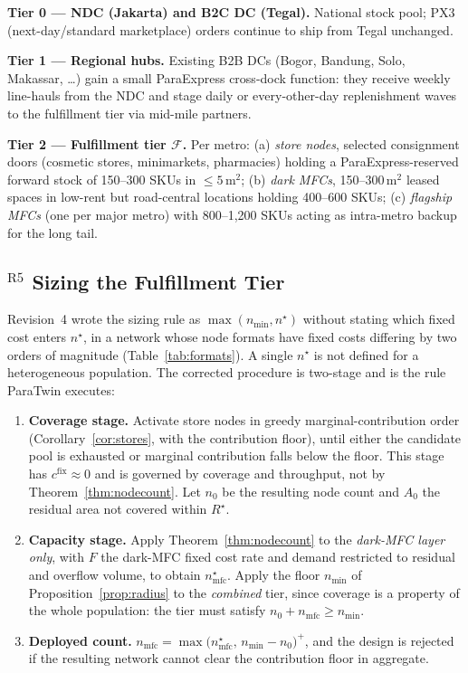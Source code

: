 \documentclass[10pt,twocolumn,letterpaper]{article}
\theoremstyle{definition}
\begin{document}
\textbf{Tier 0 --- NDC (Jakarta) and B2C DC (Tegal).} National stock pool; PX3 (next-day/standard marketplace) orders continue to ship from Tegal unchanged.

\textbf{Tier 1 --- Regional hubs.} Existing B2B DCs (Bogor, Bandung, Solo, Makassar, \dots) gain a small ParaExpress cross-dock function: they receive weekly line-hauls from the NDC and stage daily or every-other-day replenishment waves to the fulfillment tier via mid-mile partners.

\textbf{Tier 2 --- Fulfillment tier $\mathcal{F}$.} Per metro: (a) \emph{store nodes}, selected consignment doors (cosmetic stores, minimarkets, pharmacies) holding a ParaExpress-reserved forward stock of 150--300 SKUs in $\le5$\,m$^2$; (b) \emph{dark MFCs}, 150--300\,m$^2$ leased spaces in low-rent but road-central locations holding 400--600 SKUs; (c) \emph{flagship MFCs} (one per major metro) with 800--1,200 SKUs acting as intra-metro backup for the long tail.

\subsection{$^{\mathrm{R5}}$ Sizing the Fulfillment Tier}\label{sec:sizing}

Revision~4 wrote the sizing rule as $\max(n_{\min},n^\star)$ without stating which fixed cost enters $n^\star$, in a network whose node formats have fixed costs differing by two orders of magnitude (Table~\ref{tab:formats}). A single $n^\star$ is not defined for a heterogeneous population. The corrected procedure is two-stage and is the rule ParaTwin executes:

\begin{enumerate}
\item \textbf{Coverage stage.} Activate store nodes in greedy marginal-contribution order (Corollary~\ref{cor:stores}, with the contribution floor), until either the candidate pool is exhausted or marginal contribution falls below the floor. This stage has $c^{\mathrm{fix}}\approx0$ and is governed by coverage and throughput, not by Theorem~\ref{thm:nodecount}. Let $n_0$ be the resulting node count and $A_0$ the residual area not covered within $R^\star$.
\item \textbf{Capacity stage.} Apply Theorem~\ref{thm:nodecount} to the \emph{dark-MFC layer only}, with $F$ the dark-MFC fixed cost rate and demand restricted to residual and overflow volume, to obtain $n^\star_{\mathrm{mfc}}$. Apply the floor $n_{\min}$ of Proposition~\ref{prop:radius} to the \emph{combined} tier, since coverage is a property of the whole population: the tier must satisfy $n_0+n_{\mathrm{mfc}}\ge n_{\min}$.
\item \textbf{Deployed count.} $n_{\mathrm{mfc}}=\max\bigl(n^\star_{\mathrm{mfc}},\,n_{\min}-n_0\bigr)^{+}$, and the design is rejected if the resulting network cannot clear the contribution floor in aggregate.
\end{enumerate}
\end{document}
